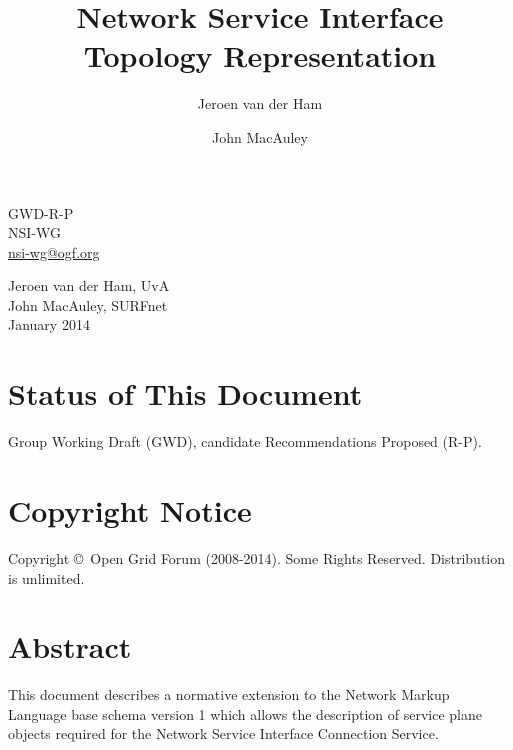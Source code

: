 \documentclass[12pt]{article}  %
\title{Network Service Interface Topology Representation}
\author{Jeroen van der Ham \and John MacAuley}
\newcommand{\headerstyle}{\sffamily} %
\newcommand{\ifnonempty}[2]{\ifthenelse{\isundefined{#1}}{}{\ifthenelse{\equal{#1}{}}{}{#2}}}
\newcommand{\authorsshort}{Jeroen van der Ham, UvA\\ John MacAuley, SURFnet}
\newcommand{\publicationdate}{January 2014}  %
\newcommand{\copyrightyears}{2008-2014}  %
\newcommand{\docseries}{GWD-R-P}  %
\begin{document}
{\noindent
\begin{minipage}[t]{1.5in}
\headerstyle
\docseries \\
NSI-WG \\
\href{mailto:nsi-wg@ogf.org}{nsi-wg@ogf.org}
\end{minipage}
\hfill
\raggedleft
\begin{minipage}[t]{4.5in}
\raggedleft
\headerstyle
\authorsshort \\
\vspace{1em}
\publicationdate \\
\ifnonempty{\revisiondate}{Revised \revisiondate \\}
\end{minipage}
}

\vspace{1em}
\begin{center}
\makeatletter
\Large\bf\textsf \@title
\makeatother
\end{center}


\section*{Status of This Document}

Group Working Draft (GWD), candidate Recommendations Proposed (R-P).


% 

\section*{Copyright Notice}

Copyright \copyright \ Open Grid Forum (\copyrightyears).  Some Rights Reserved.  
Distribution is unlimited.

\section*{Abstract}

This document describes a normative extension to the Network Markup Language base schema version 1 
which allows the description of service plane objects required for the Network Service Interface
Connection Service.
\end{document}
